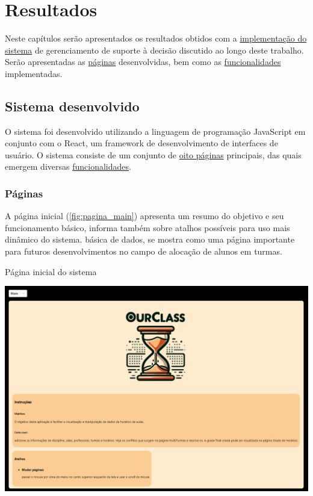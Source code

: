 \chapter{Resultados} \label{chap:resultados} %

Neste capítulos serão apresentados os resultados obtidos com a \hyperref[sec:sistema]{implementação do sistema} de gerenciamento de suporte à decisão discutido ao longo deste trabalho. Serão apresentadas as \hyperref[ssec:paginas]{páginas} desenvolvidas, bem como as \hyperref[ssec:funcionalidades]{funcionalidades} implementadas.

\section{Sistema desenvolvido} \label{sec:sistema}

O sistema foi desenvolvido utilizando a linguagem de programação JavaScript em conjunto com o React, um framework de desenvolvimento de interfaces de usuário. O sistema consiste de um conjunto de \hyperref[ssec:paginas]{oito páginas} principais, das quais emergem diversas \hyperref[ssec:funcionalidades]{funcionalidades}.

\subsection{Páginas} \label{ssec:paginas}

A página inicial (\autoref{fig:pagina_main}) apresenta um resumo do objetivo e seu funcionamento básico, informa também sobre atalhos possíveis para uso mais dinâmico do sistema.
básica de dados, se mostra como uma página importante para futuros desenvolvimentos no campo de alocação de alunos em turmas.

\begin{MyCenteredFigure} \caption{Página inicial do sistema} \label{fig:pagina_main}
  \includegraphics[width=\textwidth]{files/img/2.02!7-resultados/1-Main.png}
\end{MyCenteredFigure}

